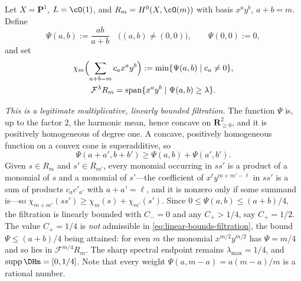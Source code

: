 \begin{example}
\label{ex:ch33-harmonic-not-fg}
Let $X=\mathbf P^1$, $L=\cO(1)$, and $R_m=H^0(X,\cO(m))$ with basis
$x^ay^b$, $a+b=m$.  Define
\begin{equation}
\label{eq:ch33-harmonic-weights}
 \Psi(a,b):=\frac{ab}{a+b}\quad\bigl((a,b)\ne(0,0)\bigr),
 \qquad \Psi(0,0):=0 ,
\end{equation}
and set
\begin{equation}
\label{eq:ch33-harmonic-filtration}
\begin{gathered}
 \chi_m\Bigl(\sum_{a+b=m}c_{a}x^ay^b\Bigr)
 :=\min\{\Psi(a,b)\mid c_a\ne0\},\\
 \mathcal F^\lambda R_m
 =\operatorname{span}\{x^ay^b\mid\Psi(a,b)\geq\lambda\}.
\end{gathered}
\end{equation}

\emph{This is a legitimate multiplicative, linearly bounded filtration.}
The function $\Psi$ is, up to the factor $2$, the harmonic mean, hence
concave on $\mathbf R^2_{\geq0}$, and it is positively homogeneous of
degree one.  A concave, positively homogeneous function on a convex cone is
superadditive, so
\[
 \Psi(a+a',b+b')\geq\Psi(a,b)+\Psi(a',b') .
\]
Given $s\in R_m$ and $s'\in R_{m'}$, every monomial occurring in
$ss'$ is a product of a monomial of $s$ and a monomial of $s'$---the
coefficient of $x^{\ell}y^{m+m'-\ell}$ in $ss'$ is a sum of products
$c_ac'_{a'}$ with $a+a'=\ell$, and it is nonzero only if some summand
is---so
$\chi_{m+m'}(ss')\geq\chi_m(s)+\chi_{m'}(s')$.  Since
$0\leq\Psi(a,b)\leq(a+b)/4$, the filtration is linearly bounded with
$C_-=0$ and any $C_+>1/4$, say $C_+=1/2$.  The value $C_+=1/4$ is
\emph{not} admissible in \eqref{eq:linear-bounds-filtration}, the bound
$\Psi\leq(a+b)/4$ being attained: for even $m$ the monomial
$x^{m/2}y^{m/2}$ has $\Psi=m/4$ and so lies in
$\mathcal F^{m/4}R_m$.  The sharp spectral endpoint remains
$\lambda_{\max}=1/4$, and $\operatorname{supp}\DHm=[0,1/4]$.
Note that every weight
$\Psi(a,m-a)=a(m-a)/m$ is a rational number.


\end{example}
